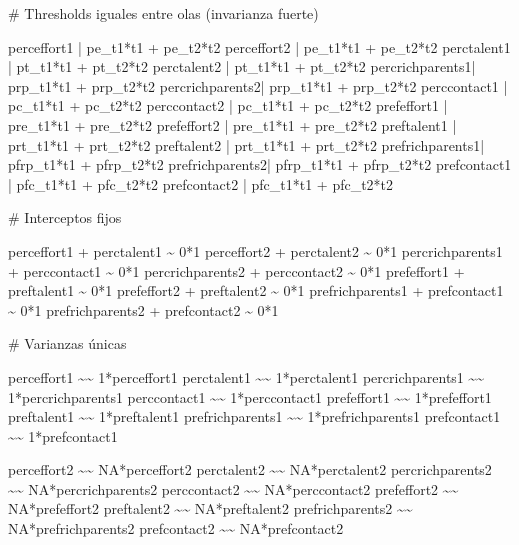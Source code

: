 \documentclass[
  12pt,
]{article}
\newenvironment{Shaded}{\begin{snugshade}}{\end{snugshade}}
\newcommand{\StringTok}[1]{\textcolor[rgb]{0.13,0.47,0.30}{#1}}
\begin{document}
\begin{Shaded}
\begin{Highlighting}[]
\StringTok{\# Thresholds iguales entre olas (invarianza fuerte)}

\StringTok{perceffort1     | pe\_t1*t1 + pe\_t2*t2}
\StringTok{perceffort2     | pe\_t1*t1 + pe\_t2*t2}
\StringTok{perctalent1     | pt\_t1*t1 + pt\_t2*t2}
\StringTok{perctalent2     | pt\_t1*t1 + pt\_t2*t2}
\StringTok{percrichparents1| prp\_t1*t1 + prp\_t2*t2}
\StringTok{percrichparents2| prp\_t1*t1 + prp\_t2*t2}
\StringTok{perccontact1    | pc\_t1*t1 + pc\_t2*t2}
\StringTok{perccontact2    | pc\_t1*t1 + pc\_t2*t2}
\StringTok{prefeffort1     | pre\_t1*t1 + pre\_t2*t2}
\StringTok{prefeffort2     | pre\_t1*t1 + pre\_t2*t2}
\StringTok{preftalent1     | prt\_t1*t1 + prt\_t2*t2}
\StringTok{preftalent2     | prt\_t1*t1 + prt\_t2*t2}
\StringTok{prefrichparents1| pfrp\_t1*t1 + pfrp\_t2*t2}
\StringTok{prefrichparents2| pfrp\_t1*t1 + pfrp\_t2*t2}
\StringTok{prefcontact1    | pfc\_t1*t1 + pfc\_t2*t2}
\StringTok{prefcontact2    | pfc\_t1*t1 + pfc\_t2*t2}


\StringTok{\# Interceptos fijos}

\StringTok{perceffort1 + perctalent1 \textasciitilde{} 0*1}
\StringTok{perceffort2 + perctalent2 \textasciitilde{} 0*1}
\StringTok{percrichparents1 + perccontact1 \textasciitilde{} 0*1}
\StringTok{percrichparents2 + perccontact2 \textasciitilde{} 0*1}
\StringTok{prefeffort1 + preftalent1 \textasciitilde{} 0*1}
\StringTok{prefeffort2 + preftalent2 \textasciitilde{} 0*1}
\StringTok{prefrichparents1 + prefcontact1 \textasciitilde{} 0*1}
\StringTok{prefrichparents2 + prefcontact2 \textasciitilde{} 0*1}


\StringTok{\# Varianzas únicas}

\StringTok{perceffort1 \textasciitilde{}\textasciitilde{} 1*perceffort1}
\StringTok{perctalent1 \textasciitilde{}\textasciitilde{} 1*perctalent1}
\StringTok{percrichparents1 \textasciitilde{}\textasciitilde{} 1*percrichparents1}
\StringTok{perccontact1 \textasciitilde{}\textasciitilde{} 1*perccontact1}
\StringTok{prefeffort1 \textasciitilde{}\textasciitilde{} 1*prefeffort1}
\StringTok{preftalent1 \textasciitilde{}\textasciitilde{} 1*preftalent1}
\StringTok{prefrichparents1 \textasciitilde{}\textasciitilde{} 1*prefrichparents1}
\StringTok{prefcontact1 \textasciitilde{}\textasciitilde{} 1*prefcontact1}

\StringTok{perceffort2 \textasciitilde{}\textasciitilde{} NA*perceffort2}
\StringTok{perctalent2 \textasciitilde{}\textasciitilde{} NA*perctalent2}
\StringTok{percrichparents2 \textasciitilde{}\textasciitilde{} NA*percrichparents2}
\StringTok{perccontact2 \textasciitilde{}\textasciitilde{} NA*perccontact2}
\StringTok{prefeffort2 \textasciitilde{}\textasciitilde{} NA*prefeffort2}
\StringTok{preftalent2 \textasciitilde{}\textasciitilde{} NA*preftalent2}
\StringTok{prefrichparents2 \textasciitilde{}\textasciitilde{} NA*prefrichparents2}
\StringTok{prefcontact2 \textasciitilde{}\textasciitilde{} NA*prefcontact2}



\end{Highlighting}
\end{Shaded}
\end{document}
